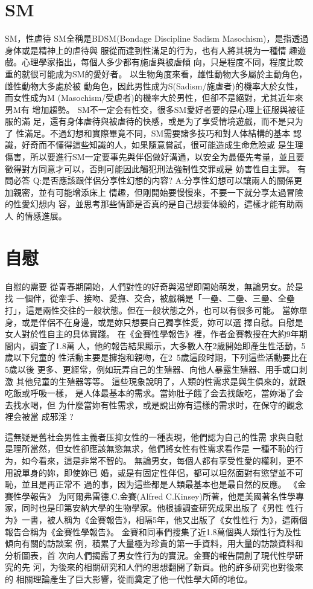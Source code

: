 \documentclass[12pt,UTF8]{ctexbook}
\begin{document}
\chapter{SM}

SM，性虐待
SM全稱是BDSM(Bondage Discipline Sadism
Masochism)，是指透過身体或是精神上的虐待與
服從而達到性滿足的行为，也有人將其視为一種情
趣遊戲。心理學家指出，每個人多少都有施虐與被虐傾
向，只是程度不同，程度比較重的就很可能成为SM的愛好者。
以生物角度來看，雄性動物大多屬於主動角色，雌性動物大多處於被
動角色，因此男性成为S(Sadism/施虐者)的機率大於女性，而女性成为M
(Masochism/受虐者)的機率大於男性，但卻不是絕對，尤其近年來男M有
增加趨勢。
SM不一定会有性交，很多SM愛好者要的是心理上征服與被征服的滿
足，還有身体虐待與被虐待的快感，或是为了享受情境遊戲，而不是只为了
性滿足。不過幻想和實際畢竟不同，SM需要諸多技巧和對人体結構的基本
認識，好奇而不懂得這些知識的人，如果隨意嘗試，很可能造成生命危險或
是生理傷害，所以要進行SM一定要事先與伴侶做好溝通，以安全为最優先考量，並且要徵得對方同意才可以，否則可能因此觸犯刑法強制性交罪或是
妨害性自主罪。
有問必答
Q:是否應該跟伴侶分享性幻想的内容?
A:分享性幻想可以讓兩人的關係更加親密，並有可能增添床上
情趣，但剛開始要慢慢來，不要一下就分享太過冒險的性愛幻想内
容，並思考那些情節是否真的是自己想要体驗的，這樣才能有助兩人
的情感進展。

\chapter{自慰}

自慰的需要
從青春期開始，人們對性的好奇與渴望即開始萌发，無論男女。於是找
一個伴，從牽手、接吻、愛撫、交合，被戲稱是「一壘、二壘、三壘、全壘
打」，這是兩性交往的一般状態。但在一般状態之外，也可以有很多可能。
當妳單身，或是伴侶不在身邊，或是妳只想要自己獨享性愛，妳可以選
擇自慰。自慰是女人對於性自主的具体實踐。
在《金賽性學報告》裡，作者金賽教授在大約9年期間内，調查了1.8萬
人，他的報告結果顯示，大多數人在2歲開始即產生性活動，5歲以下兒童的
性活動主要是擁抱和親吻，在2~5歲這段时期，下列這些活動要比在5歲以後
更多、更經常，例如玩弄自己的生殖器、向他人暴露生殖器、用手或口刺激
其他兒童的生殖器等等。
這些現象說明了，人類的性需求是與生俱來的，就跟吃飯或呼吸一樣，
是人体最基本的需求。當妳肚子餓了会去找飯吃，當妳渴了会去找水喝，但
为什麼當妳有性需求，或是說出妳有這樣的需求时，在保守的觀念裡会被當
成邪淫 ?

這無疑是舊社会男性主義者压抑女性的一種表現，他們認为自己的性需
求與自慰是理所當然，但女性卻應該無慾無求，他們將女性有性需求看作是
一種不恥的行为，如今看來，這是非常不智的。
無論男女，每個人都有享受性愛的權利，更不用說單身的妳，即使妳已
婚，或是有固定性伴侶，都可以坦然面對有慾望並不可恥，並且是再正常不
過的事，因为這些都是人類最基本也是最自然的反應。
《金賽性學報告》
为阿爾弗雷德.C.金賽(Alfred C.Kinsey)所著，他是美國著名性學專
家，同时也是印第安納大學的生物學家。他根據調查研究成果出版了《男性
性行为》一書，被人稱为《金賽報告》，相隔5年，他又出版了《女性性行
为》，這兩個報告合稱为《金賽性學報告》。
金賽和同事們搜集了近1.8萬個與人類性行为及性傾向有關的訪談案
例，積累了大量極为珍貴的第一手資料，用大量的訪談資料和分析圖表，首
次向人們揭露了男女性行为的實況。金賽的報告開創了現代性學研究的先
河，为後來的相關研究和人們的思想翻開了新頁。他的許多研究也對後來的
相關理論產生了巨大影響，從而奠定了他一代性學大師的地位。
\end{document}
